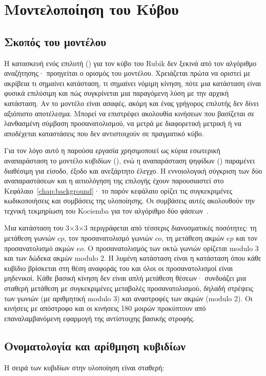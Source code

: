 \chapter{Μοντελοποίηση του Κύβου}
\label{chap:model}

\section{Σκοπός του μοντέλου}
\label{sec:model-purpose}
Η κατασκευή ενός επιλυτή () για τον κύβο του Rubik δεν ξεκινά από τον αλγόριθμο αναζήτησης· προηγείται ο ορισμός του μοντέλου. Χρειάζεται πρώτα να οριστεί με ακρίβεια τι σημαίνει κατάσταση, τι σημαίνει νόμιμη κίνηση, πότε μια κατάσταση είναι φυσικά επιλύσιμη και πώς συγκρίνεται μια παραγόμενη λύση με την αρχική κατάσταση. Αν το μοντέλο είναι ασαφές, ακόμη και ένας γρήγορος επιλυτής δεν δίνει αξιόπιστο αποτέλεσμα. Μπορεί να επιστρέφει ακολουθία κινήσεων που βασίζεται σε λανθασμένη σύμβαση προσανατολισμού, να μετρά με διαφορετική μετρική ή να αποδέχεται καταστάσεις που δεν αντιστοιχούν σε πραγματικό κύβο.

Για τον λόγο αυτό η παρούσα εργασία χρησιμοποιεί ως κύρια εσωτερική αναπαράσταση το μοντέλο κυβιδίων (), ενώ η αναπαράσταση ψηφίδων () παραμένει διαθέσιμη για είσοδο, έξοδο και ανεξάρτητο έλεγχο. Η εννοιολογική σύγκριση των δύο αναπαραστάσεων και η αιτιολόγηση της επιλογής έχουν παρουσιαστεί στο Κεφάλαιο~\ref{chap:background}· το παρόν κεφάλαιο ορίζει τις συγκεκριμένες κωδικοποιήσεις και συμβάσεις της υλοποίησης. Οι συμβάσεις αυτές ακολουθούν την τεχνική τεκμηρίωση του Kociemba για τον αλγόριθμο δύο φάσεων~\cite{kociembaTwoPhase,kociembaImplementationDetails}.

Μια κατάσταση του 3×3×3 περιγράφεται από τέσσερις διανυσματικές ποσότητες: τη μετάθεση γωνιών \(cp\), τον προσανατολισμό γωνιών \(co\), τη μετάθεση ακμών \(ep\) και τον προσανατολισμό ακμών \(eo\). Ο προσανατολισμός των οκτώ γωνιών ορίζεται modulo 3 και των δώδεκα ακμών modulo 2. Η λυμένη κατάσταση είναι η κατάσταση όπου κάθε κυβίδιο βρίσκεται στη θέση αναφοράς του και όλοι οι προσανατολισμοί είναι μηδενικοί. Κάθε βασική κίνηση δεν είναι απλή μετάθεση θέσεων· συνδυάζει μια σταθερή μετάθεση με συγκεκριμένες μεταβολές προσανατολισμού, δηλαδή στρέψεις των γωνιών (με αριθμητική modulo 3) και αναστροφές των ακμών (modulo 2). Οι κινήσεις με απόστροφο και οι κινήσεις 180 μοιρών προκύπτουν από επαναλαμβανόμενη εφαρμογή της αντίστοιχης βασικής στροφής.

\section{Ονοματολογία και αρίθμηση κυβιδίων}
\label{sec:model-cubie-indexing}
Η σειρά των κυβιδίων στην υλοποίηση είναι σταθερή:

